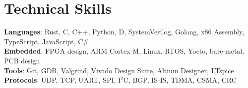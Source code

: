 \documentclass[letterpaper,11pt]{article}
\begin{document}
\section{Technical Skills}
 \begin{itemize}[leftmargin=0.15in, label={}]
    \small{\item{
     \textbf{Languages}{: Rust, C, C++, Python, D, SystemVerilog, Golang, x86 Assembly, TypeScript, JavaScript, C\#} \\
     \textbf{Embedded}{: FPGA design, ARM Cortex-M, Linux, RTOS, Yocto, bare-metal, PCB design} \\
     \textbf{Tools}{: Git, GDB, Valgrind, Vivado Design Suite, Altium Designer, LTspice} \\
     \textbf{Protocols}{: UDP, TCP, UART, SPI, I$^2$C, BGP, IS-IS, TDMA, CSMA, CRC} \\
    }}
 \end{itemize}
\end{document}
